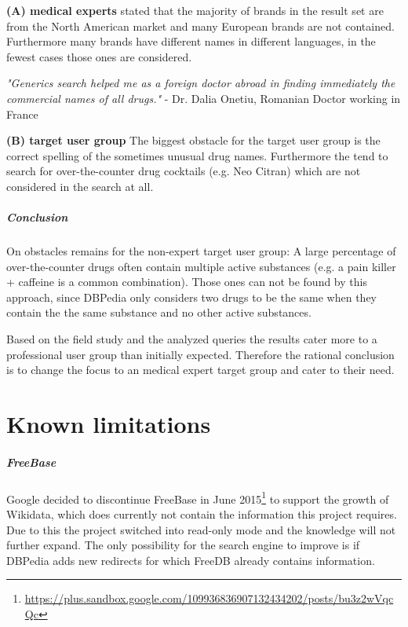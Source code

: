 \documentclass[11pt,titlepage,oneside,openany]{book}
\begin{document}
\textbf{(A) medical experts} stated that the majority of brands in the result set are from the North American market and many European brands are not contained. Furthermore many brands have different names in different languages, in the fewest cases those ones are considered.

\textit{"Generics search helped me as a foreign doctor abroad in finding immediately the commercial names of all drugs."} - Dr. Dalia Onetiu, Romanian Doctor working in France

\textbf{(B) target user group} The biggest obstacle for the target user group is the correct spelling of the sometimes unusual drug names. Furthermore the tend to search for over-the-counter drug cocktails (e.g. Neo Citran) which are not considered in the search at all.

\paragraph{Conclusion}
\label{conclusion}

On obstacles remains for the non-expert target user group: 
A large percentage of over-the-counter drugs often contain multiple active substances (e.g. a pain killer + caffeine is a common combination). Those ones can not be found by this approach, since DBPedia only considers two drugs to be the same when they contain the the same substance and no other active substances.

Based on the field study and the analyzed queries the results cater more to a professional user group than initially expected. Therefore the rational conclusion is to change the focus to an medical expert target group and cater to their need.



\label{ex:ecotrin}


\chapter{Known limitations}
\label{cha:limiations}




\paragraph{FreeBase}
\label{prob:freebase}
Google decided to discontinue FreeBase in June 2015\footnote{\url{https://plus.sandbox.google.com/109936836907132434202/posts/bu3z2wVqcQc}} to support the growth of Wikidata, which does currently not contain the information this project requires. Due to this the project switched into read-only mode and the knowledge will not further expand. The only possibility for the search engine to improve is if DBPedia adds new redirects for which FreeDB already contains information. 
\end{document}
